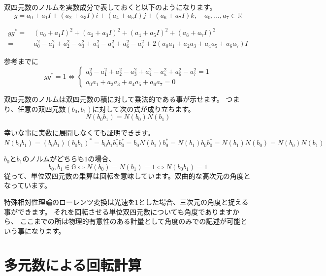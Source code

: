 \documentclass[a4paper,12pt,notitlepage]{jsreport}
\begin{document}
双四元数のノルムを実数成分で表しておくと以下のようになります。
\begin{equation}
  g=a_0+a_1I+(a_2+a_3I)i+(a_4+a_5I)j+(a_6+a_7I)k,\quad a_0,..., a_7\in\mathbb{R}
\end{equation}

\begin{equation}
  \begin{split}
    gg^*=~&(a_0+a_1I)^2+(a_2+a_3I)^2+(a_4+a_5I)^2+(a_6+a_7I)^2\\
    =~&a_0^2-a_1^2+a_2^2-a_3^2+a_4^2-a_5^2+a_6^2-a_7^2+2(a_0a_1+a_2a_3+a_4a_5+a_6a_7)I
  \end{split}
\end{equation}

参考までに
\begin{equation}
  gg^*=1\iff
  \begin{cases}
    a_0^2-a_1^2+a_2^2-a_3^2+a_4^2-a_5^2+a_6^2-a_7^2=1\\
    a_0a_1+a_2a_3+a_4a_5+a_6a_7=0
  \end{cases}
\end{equation}

双四元数のノルムは双四元数の積に対して乗法的である事が示せます。
つまり、任意の双四元数$(b_0,b_1)$に対して次の式が成り立ちます。
\begin{equation}
  N(b_0b_1)=N(b_0)N(b_1)
\end{equation}

幸いな事に実数に展開しなくても証明できます。
\begin{equation}
  N(b_0b_1)=(b_0b_1)(b_0b_1)^*=b_0b_1b_1^*b_0^*=b_0N(b_1)b_0^*=N(b_1)b_0b_0^*=N(b_1)N(b_0)=N(b_0)N(b_1)
\end{equation}

$b_0$と$b_1$のノルムがどちらも$1$の場合、
\begin{equation}
  b_0,b_1\in\mathbb{G}\iff N(b_0)=N(b_1)=1\iff N(b_0b_1)=1
\end{equation}
従って、単位双四元数の乗算は回転を意味しています。双曲的な高次元の角度となっています。

特殊相対性理論のローレンツ変換は光速を1とした場合、三次元の角度と捉える事ができます。
それを回転させる単位双四元数についても角度でありますから、
ここまでの所は物理的有意性のある計量として角度のみでの記述が可能という事になります。

\chapter{多元数による回転計算}
\end{document}
